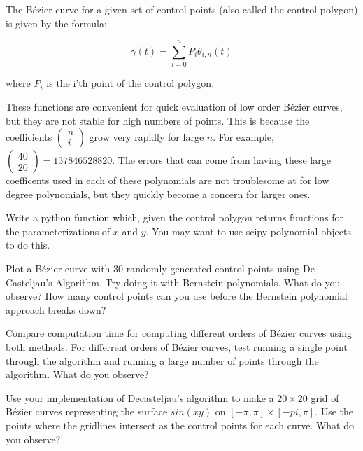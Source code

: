 The B\'{e}zier curve for a given set of control points (also called the control polygon) is given by the formula:

$$\gamma (t) = \sum_{i=0}^n P_i \theta_{i,n} (t)$$ 

where $P_i$ is the i'th point of the control polygon.

These functions are convenient for quick evaluation of low order B\'{e}zier curves, but they are not stable for high numbers of points. 
This is because the coefficients $\left( \begin{smallmatrix} n\\ i \end{smallmatrix} \right)$ grow very rapidly for large $n$. 
For example, $\left( \begin{smallmatrix} 40\\ 20 \end{smallmatrix} \right)=137846528820$. 
The errors that can come from having these large coefficents used in each of these polynomials are not troublesome at for low degree polynomials, but they quickly become a concern for larger ones. 

\begin{problem}
Write a python function which, given the control polygon returns functions for the parameterizations of $x$ and $y$. 
You may want to use scipy polynomial objects to do this.
\end{problem}

\begin{problem}
Plot a B\'{e}zier curve with 30 randomly generated control points using De Casteljau's Algorithm. 
Try doing it with Bernstein polynomials. 
What do you observe? 
How many control points can you use before the Bernstein polynomial approach breaks down?
\end{problem}

\begin{problem}
Compare computation time for computing different orders of B\'{e}zier curves using both methods. 
For differrent orders of B\'{e}zier curves, test running a single point through the algorithm and running a large number of points through the algorithm. 
What do you observe?
\end{problem}

\begin{problem}
Use your implementation of Decasteljau's algorithm to make a $20\times 20$ grid of B\'{e}zier curves representing the surface $sin(xy)$ on $[-\pi,\pi]\times [-pi,\pi]$.
Use the points where the gridlines intersect as the control points for each curve. 
What do you observe?
\end{problem}

